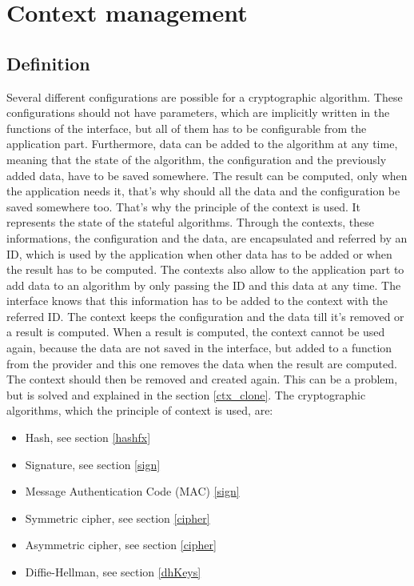\chapter{Context management}

\section{Definition}

Several different configurations are possible for a cryptographic algorithm. These configurations
should not have parameters, which are implicitly written in the functions of the interface, but all
of them has to be configurable from the application part. Furthermore, data can be added to the
algorithm at any time, meaning that the state of the algorithm, the configuration and the previously
added data, have to be saved somewhere. The result can be computed, only when the application
needs it, that's why should all the data and the configuration be saved
somewhere too.
That's why the principle of the context is used. It represents the state of the
stateful algorithms.
Through the contexts, these informations, the configuration and the data, are encapsulated and
referred by an ID, which is used by the application when other data has to be added or when the
result has to be computed.
The contexts also allow to the application part to add data to an algorithm by only passing the ID
and this data at any time. The interface knows that this information has to be added to the context
with the referred ID. The context keeps the configuration and the data till it's
removed or a result is computed. When a result is computed, the context cannot be used again, because the data are
not saved in the interface, but added to a function from the provider and this one removes the data
when the result are computed. The context should then be removed and created again. This can be a
problem, but is solved and explained in the section \ref{ctx_clone}.
The cryptographic algorithms, which the principle of context is used, are:
\begin{itemize}[noitemsep]
  \item Hash, see section \ref{hashfx}
  \item Signature, see section \ref{sign}
  \item Message Authentication Code (MAC) \ref{sign}
  \item Symmetric cipher, see section \ref{cipher}
  \item Asymmetric cipher, see section \ref{cipher}
  \item Diffie-Hellman, see section \ref{dhKeys}
\end{itemize}



